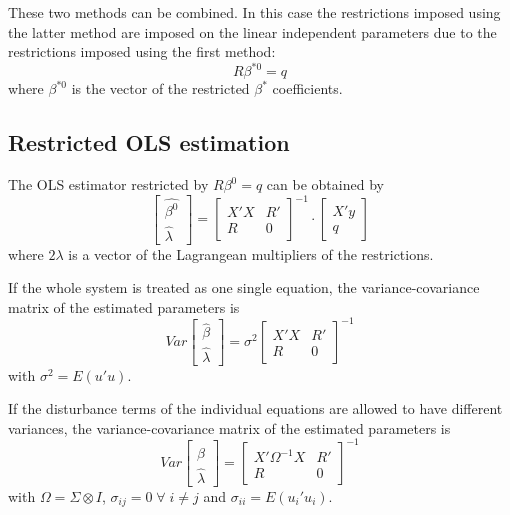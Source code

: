 These two methods can be combined. In this case the restrictions
imposed using the latter method are imposed on the linear independent 
parameters due to the restrictions imposed using the first method:
\begin{equation}
   R \beta^{*0} = q
\end{equation}
where $\beta^{*0}$ is the vector of the restricted $\beta^*$ coefficients.

\subsection{Restricted OLS estimation}

The OLS estimator restricted by $R \beta^0 = q$ can be obtained by
\begin{equation}
   \left[ \begin{array}{c}
      \widehat{\beta^0} \\ \widehat{\lambda}
   \end{array} \right]
   =
   \left[ \begin{array}{cc}
      X' X & R' \\ 
      R & 0
   \end{array} \right]^{-1}
   \cdot
   \left[ \begin{array}{c}
      X' y \\ q 
   \end{array} \right]
\end{equation}
where $2\lambda$ is a vector of the Lagrangean multipliers of the restrictions.

If the whole system is treated as one single equation, 
the variance-covariance matrix of the estimated parameters is
\begin{equation}
   Var 
   \left[ \begin{array}{c}
      \widehat{\beta} \\ \widehat{\lambda}
   \end{array} \right] 
   = \sigma^2 
   \left[ \begin{array}{cc}
      X' X & R' \\ 
      R & 0
   \end{array} \right]^{-1}
\end{equation}
with $\sigma^2 = E \left( u' u \right)$.

If the disturbance terms of the individual equations 
are allowed to have different variances, 
the variance-covariance matrix of the estimated parameters is
\begin{equation}
   Var 
   \left[ \begin{array}{c}
      \widehat{\beta} \\ \widehat{\lambda}
   \end{array} \right] 
   = 
   \left[ \begin{array}{cc}
      X' \Omega^{-1} X & R' \\ 
      R & 0
   \end{array} \right]^{-1}
\end{equation}
with $\Omega = \Sigma \otimes I$, 
$\sigma_{ij} = 0 \; \forall \; i \neq j$ and
$\sigma_{ii} = E \left( u_i' u_i \right)$.

